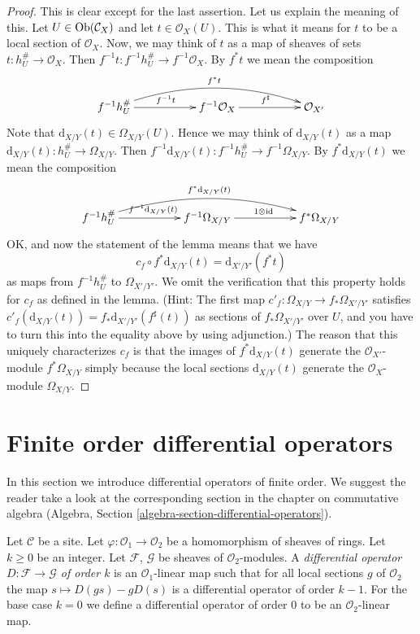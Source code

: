 \begin{proof}
This is clear except for the last assertion. Let us explain the meaning of
this. Let $U \in \mathop{\mathrm{Ob}}\nolimits(\mathcal{C}_X)$ and let $t \in \mathcal{O}_X(U)$.
This is what it means for $t$ to be a local section of $\mathcal{O}_X$.
Now, we may think of $t$ as a map of sheaves of sets
$t : h_U^\# \to \mathcal{O}_X$. Then
$f^{-1}t : f^{-1}h_U^\# \to f^{-1}\mathcal{O}_X$. By $f^*t$ we mean
the composition
$$
\xymatrix{
f^{-1}h_U^\# \ar[rr]^{f^{-1}t} \ar@/^4ex/[rrrr]^{f^*t} & &
f^{-1}\mathcal{O}_X \ar[rr]^{f^\sharp} & &
\mathcal{O}_{X'}
}
$$
Note that $\text{d}_{X/Y}(t) \in \Omega_{X/Y}(U)$. Hence we may think of
$\text{d}_{X/Y}(t)$ as a map $\text{d}_{X/Y}(t) : h_U^\# \to \Omega_{X/Y}$.
Then $f^{-1}\text{d}_{X/Y}(t) : f^{-1}h_U^\# \to f^{-1}\Omega_{X/Y}$.
By $f^*\text{d}_{X/Y}(t)$ we mean the composition
$$
\xymatrix{
f^{-1}h_U^\#
\ar[rr]^{f^{-1}\text{d}_{X/Y}(t)}
\ar@/^4ex/[rrrr]^{f^*\text{d}_{X/Y}(t)} & &
f^{-1}\Omega_{X/Y} \ar[rr]^{1 \otimes \text{id}} & &
f^*\Omega_{X/Y}
}
$$
OK, and now the statement of the lemma means that we have
$$
c_f \circ f^*\text{d}_{X/Y}(t) = \text{d}_{X'/Y'}(f^*t)
$$
as maps from $f^{-1}h_U^\#$ to $\Omega_{X'/Y'}$. We omit the verification
that this property holds for $c_f$ as defined in the lemma. (Hint: The first
map $c'_f : \Omega_{X/Y} \to f_*\Omega_{X'/Y'}$ satisfies
$c'_f(\text{d}_{X/Y}(t)) = f_*\text{d}_{X'/Y'}(f^\sharp(t))$ as sections of
$f_*\Omega_{X'/Y'}$ over $U$, and you have to
turn this into the equality above by using adjunction.)
The reason that this uniquely characterizes $c_f$ is that the images
of $f^*\text{d}_{X/Y}(t)$ generate the $\mathcal{O}_{X'}$-module
$f^*\Omega_{X/Y}$ simply because the local sections $\text{d}_{X/Y}(t)$
generate the $\mathcal{O}_X$-module $\Omega_{X/Y}$.
\end{proof}





\section{Finite order differential operators}
\label{section-differential-operators}

\noindent
In this section we introduce differential operators of finite order.
We suggest the reader take a look at the corresponding section
in the chapter on commutative algebra
(Algebra, Section \ref{algebra-section-differential-operators}).

\begin{definition}
\label{definition-differential-operators}
Let $\mathcal{C}$ be a site. Let $\varphi : \mathcal{O}_1 \to \mathcal{O}_2$
be a homomorphism of sheaves of rings. Let $k \geq 0$ be an integer.
Let $\mathcal{F}$, $\mathcal{G}$ be sheaves of $\mathcal{O}_2$-modules.
A {\it differential operator $D : \mathcal{F} \to \mathcal{G}$ of order $k$}
is an $\mathcal{O}_1$-linear map such that for all local sections
$g$ of $\mathcal{O}_2$ the map $s \mapsto D(gs) - gD(s)$ is a
differential operator of order $k - 1$. For the base case $k = 0$
we define a differential operator of order $0$ to be an
$\mathcal{O}_2$-linear map.
\end{definition}

